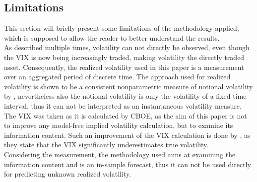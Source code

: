 \subsection{Limitations}\label{sec:43Limits}
This section will briefly present some limitations of the methodology applied, which is supposed to allow the reader to better understand the results.\\
As described multiple times, volatility can not directly be observed, even though the \ac{VIX} is now being increasingly traded, making volatility the directly traded asset. Consequently, the realized volatility used in this paper is a measurement over an aggregated period of discrete time. The approach used for realized volatility is shown to be a consistent nonparametric measure of notional volatility by \textcite{andersen2001}, nevertheless also the notional volatility is only the volatility of a fixed time interval, thus it can not be interpreted as an instantaneous volatility measure.\\
The VIX was taken as it is calculated by \ac{CBOE}, as the aim of this paper is not to improve any model-free implied volatility calculation, but to examine its information content. Such an improvement of the \ac{VIX} calculation is done by \textcite{jiang2007}, as they state that the VIX significantly underestimates true volatility.\\
Considering the measurement, the methodology used aims at examining the information content and is an in-sample forecast, thus it can not be used directly for predicting unknown realized volatility.

